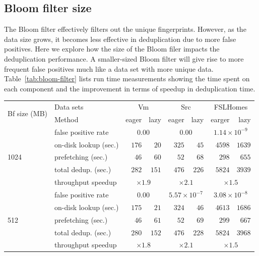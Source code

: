 \documentclass[prodmode,acmtecs]{acmsmall}
\begin{document}
\subsection{Bloom filter size}\label{se:Bloom}

The Bloom filter effectively filters out the unique fingerprints. However, as the data size grows, it becomes less effective in deduplication due to more false positives.  Here we explore how the size of the Bloom filer impacts the deduplication performance.  A smaller-sized Bloom filter will give rise to more frequent false positives much like a data set with more unique data.  Table~\ref{tab:bloom-filter} lists run time measurements showing the time spent on each component and the improvement in terms of speedup in deduplication time.

\begin{table}[htp]
\centering
\begin{tabular}{llrrrrrr}
\toprule
\multirow{2}{*}{Bf size (MB)} & Data sets& \multicolumn{2}{c}{Vm} & \multicolumn{2}{c}{Src} & \multicolumn{2}{c}{FSLHomes}\\
\cmidrule(lr){2-2} \cmidrule(lr){3-4} \cmidrule(lr){5-6} \cmidrule(lr){7-8}
 &Method & eager & lazy & eager & lazy & earger & lazy\\
\midrule

\multirow{5}{*}{1024} & false positive rate & \multicolumn{2}{c}{$0.00$} & \multicolumn{2}{c}{$0.00$} & \multicolumn{2}{c}{$1.14\times10^{-9}$} \\
& on-disk lookup (sec.)& $176$ & $20$ & $325$ & $45$ & $4598$ & $1639$ \\
& prefetching (sec.) & $46$ & $60$ & $52$ & $68$ & $298$ & $655$  \\
& total dedup. (sec.) & $282$ & $151$ & $476$ & $226$ & $5824$ & $3939$ \\
& throughput speedup & \multicolumn{2}{c}{$\times 1.9$} & \multicolumn{2}{c}{$\times 2.1$} & \multicolumn{2}{c}{$\times 1.5$} \\

\cmidrule(lr){1-1} \cmidrule(lr){2-2} \cmidrule(lr){3-4} \cmidrule(lr){5-6} \cmidrule(lr){7-8}
\multirow{5}{*}{512} & false positive rate & \multicolumn{2}{c}{$0.00$} & \multicolumn{2}{c}{$5.57\times 10^{-7}$} & \multicolumn{2}{c}{$3.08\times 10^{-8}$} \\
& on-disk lookup (sec.)& $175$ & $21$ & $324$ & $46$ & $4613$ & $1686$ \\
& prefetching (sec.) & $46$ & $61$ & $52$ & $69$ & $299$ & $667$  \\
& total dedup. (sec.) & $280$ & $152$ & $476$ & $228$ & $5824$ & $3968$ \\
& throughput speedup & \multicolumn{2}{c}{$\times 1.8$} & \multicolumn{2}{c}{$\times 2.1$} & \multicolumn{2}{c}{$\times 1.5$} \\


\end{tabular}
\end{table}
\end{document}

